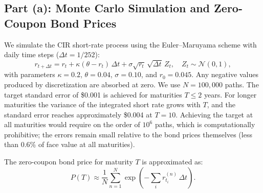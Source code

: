 \documentclass[12pt, a4paper]{article}
\begin{document}
\subsection{Part (a): Monte Carlo Simulation and Zero-Coupon Bond Prices}

We simulate the CIR short-rate process using the Euler--Maruyama scheme with daily time steps ($\Delta t = 1/252$):
\[
r_{t+\Delta t} = r_t + \kappa(\theta - r_t)\,\Delta t + \sigma\sqrt{r_t}\,\sqrt{\Delta t}\,Z_t, \quad Z_t \sim \mathcal{N}(0,1),
\]
with parameters $\kappa = 0.2$, $\theta = 0.04$, $\sigma = 0.10$, and $r_0 = 0.045$. Any negative values produced by discretization are absorbed at zero. We use $N = 100{,}000$ paths. The target standard error of \$0.001 is achieved for maturities $T \leq 2$ years. For longer maturities the variance of the integrated short rate grows with $T$, and the standard error reaches approximately \$0.004 at $T = 10$. Achieving the target at all maturities would require on the order of $10^6$ paths, which is computationally prohibitive; the errors remain small relative to the bond prices themselves (less than 0.6\% of face value at all maturities).

The zero-coupon bond price for maturity $T$ is approximated as:
\[
P(T) \approx \frac{1}{N} \sum_{n=1}^{N} \exp\!\left(-\sum_i r_{t_i}^{(n)}\,\Delta t\right).
\]
\end{document}
